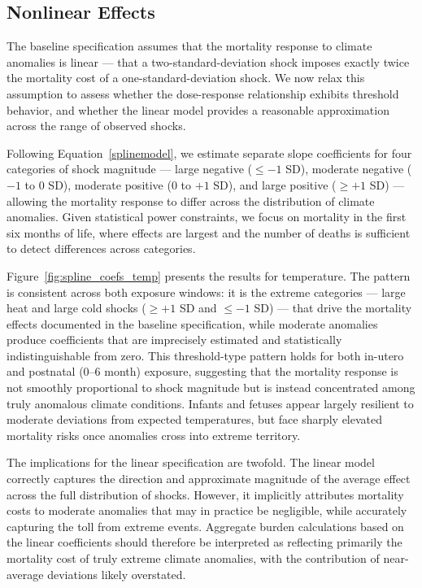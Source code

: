 \documentclass[a4paper]{article}
\begin{document}
\subsection{Nonlinear Effects}

The baseline specification assumes that the mortality response to climate anomalies is linear — that a two-standard-deviation shock imposes exactly twice the mortality cost of a one-standard-deviation shock. We now relax this assumption to assess whether the dose-response relationship exhibits threshold behavior, and whether the linear model provides a reasonable approximation across the range of observed shocks.

Following Equation~\ref{splinemodel}, we estimate separate slope coefficients for four categories of shock magnitude — large negative ($\leq -1$ SD), moderate negative ($-1$ to $0$ SD), moderate positive ($0$ to $+1$ SD), and large positive ($\geq +1$ SD) — allowing the mortality response to differ across the distribution of climate anomalies. Given statistical power constraints, we focus on mortality in the first six months of life, where effects are largest and the number of deaths is sufficient to detect differences across categories.

Figure~\ref{fig:spline_coefs_temp} presents the results for temperature. The pattern is consistent across both exposure windows: it is the extreme categories — large heat and large cold shocks ($\geq +1$ SD and $\leq -1$ SD) — that drive the mortality effects documented in the baseline specification, while moderate anomalies produce coefficients that are imprecisely estimated and statistically indistinguishable from zero. This threshold-type pattern holds for both in-utero and postnatal (0--6 month) exposure, suggesting that the mortality response is not smoothly proportional to shock magnitude but is instead concentrated among truly anomalous climate conditions. Infants and fetuses appear largely resilient to moderate deviations from expected temperatures, but face sharply elevated mortality risks once anomalies cross into extreme territory.

The implications for the linear specification are twofold. The linear model correctly captures the direction and approximate magnitude of the average effect across the full distribution of shocks. However, it implicitly attributes mortality costs to moderate anomalies that may in practice be negligible, while accurately capturing the toll from extreme events. Aggregate burden calculations based on the linear coefficients should therefore be interpreted as reflecting primarily the mortality cost of truly extreme climate anomalies, with the contribution of near-average deviations likely overstated.
\end{document}

